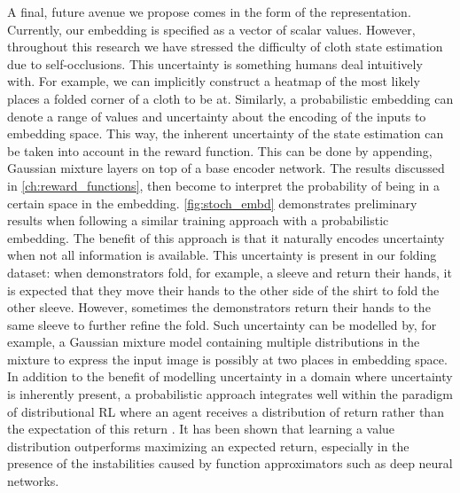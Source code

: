 \documentclass[\home/main.tex]{subfiles}
\begin{document}
A final, future avenue we propose comes in the form of the representation. Currently, our embedding is specified as a vector of scalar values. However, throughout this research we have stressed the difficulty of cloth state estimation due to self-occlusions. This uncertainty is something humans deal intuitively with. For example, we can implicitly construct a heatmap of the most likely places a folded corner of a cloth to be at. Similarly, a probabilistic embedding can denote a range of values and uncertainty about the encoding of the inputs to embedding space. This way, the inherent uncertainty of the state estimation can be taken into account in the reward function. This can be done by appending, Gaussian mixture layers on top of a base encoder network. The results discussed in \cref{ch:reward_functions}, then become to interpret the probability of being in a certain space in the embedding. \cref{fig:stoch_embd} demonstrates preliminary results when following a similar training approach with a probabilistic embedding. The benefit of this approach is that it naturally encodes uncertainty when not all information is available. This uncertainty is present in our folding dataset: when demonstrators fold, for example, a sleeve and return their hands, it is expected that they move their hands to the other side of the shirt to fold the other sleeve. However, sometimes the demonstrators return their hands to the same sleeve to further refine the fold. Such uncertainty can be modelled by, for example, a Gaussian mixture model containing multiple distributions in the mixture to express the input image is possibly at two places in embedding space. In addition to the benefit of modelling uncertainty in a domain where uncertainty is inherently present, a probabilistic approach integrates well within the paradigm of distributional RL where an agent receives a distribution of return rather than the expectation of this return \autocite{bellemare2017distributional}. It has been shown that learning a value distribution outperforms maximizing an expected return, especially in the presence of the instabilities caused by function approximators such as deep neural networks.
\end{document}
